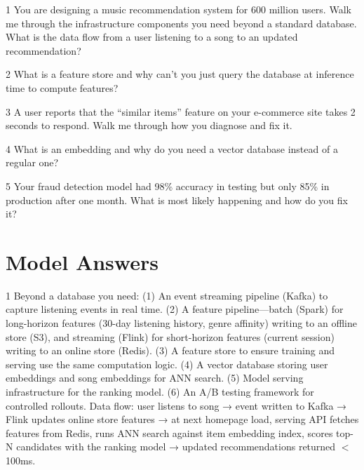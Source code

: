 \documentclass[11pt,a4paper]{article}
\begin{document}
\begin{quizbox}{1}
You are designing a music recommendation system for 600 million users. Walk me through the infrastructure components you need beyond a standard database. What is the data flow from a user listening to a song to an updated recommendation?
\end{quizbox}

\begin{quizbox}{2}
What is a feature store and why can't you just query the database at inference time to compute features?
\end{quizbox}

\begin{quizbox}{3}
A user reports that the ``similar items'' feature on your e-commerce site takes 2 seconds to respond. Walk me through how you diagnose and fix it.
\end{quizbox}

\begin{quizbox}{4}
What is an embedding and why do you need a vector database instead of a regular one?
\end{quizbox}

\begin{quizbox}{5}
Your fraud detection model had 98\% accuracy in testing but only 85\% in production after one month. What is most likely happening and how do you fix it?
\end{quizbox}

\newpage
\section*{Model Answers}

\begin{answerbox}{1}
Beyond a database you need: (1) An event streaming pipeline (Kafka) to capture listening events in real time. (2) A feature pipeline---batch (Spark) for long-horizon features (30-day listening history, genre affinity) writing to an offline store (S3), and streaming (Flink) for short-horizon features (current session) writing to an online store (Redis). (3) A feature store to ensure training and serving use the same computation logic. (4) A vector database storing user embeddings and song embeddings for ANN search. (5) Model serving infrastructure for the ranking model. (6) An A/B testing framework for controlled rollouts. Data flow: user listens to song → event written to Kafka → Flink updates online store features → at next homepage load, serving API fetches features from Redis, runs ANN search against item embedding index, scores top-N candidates with the ranking model → updated recommendations returned $<$100ms.
\end{answerbox}
\end{document}
